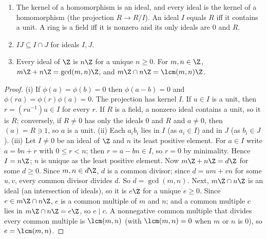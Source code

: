 \begin{proposition}\label{prop:rings:ideals}
\begin{enumerate}[label=(\roman*)]
\item The kernel of a homomorphism is an ideal, and every ideal is the kernel of a homomorphism (the projection
$R\to R/I$). An ideal $I$ equals $R$ iff it contains a unit. A ring is a field iff it is nonzero and its only ideals
are $0$ and $R$.
\item $IJ\subseteq I\cap J$ for ideals $I,J$.
\item Every ideal of $\Z$ is $n\Z$ for a unique $n\ge0$. For $m,n\in\Z$, $m\Z+n\Z=\gcd(m,n)\Z$, and $m\Z\cap n\Z=\lcm(m,n)\Z$.
\end{enumerate}
\end{proposition}

\begin{proof}
(i) If $\phi(a)=\phi(b)=0$ then $\phi(a-b)=0$ and $\phi(ra)=\phi(r)\phi(a)=0$. The projection has kernel $I$. If $u\in I$ is a unit,
then $r=(ru^{-1})u\in I$ for every $r$. If $R$ is a field, a nonzero ideal contains a unit, so it is $R$; conversely, if $R\ne0$
has only the ideals $0$ and $R$ and $a\ne0$, then $(a)=R\ni1$, so $a$ is a unit.
(ii) Each $a_ib_i$ lies in $I$ (as $a_i\in I$) and in $J$ (as $b_i\in J$).
(iii) Let $I\ne0$ be an ideal of $\Z$ and $n$ its least positive element. For $a\in I$ write $a=bn+r$ with $0\le r<n$; then
$r=a-bn\in I$, so $r=0$ by minimality. Hence $I=n\Z$; $n$ is unique as the least positive element. Now $m\Z+n\Z=d\Z$ for
some $d\ge0$. Since $m,n\in d\Z$, $d$ is a common divisor; since $d=um+vn$ for some $u,v$, every common divisor divides $d$.
So $d=\gcd(m,n)$. Next, $m\Z\cap n\Z$ is an ideal (an intersection of ideals), so it is $e\Z$ for a unique $e\ge0$. Since $e\in m\Z\cap n\Z$,
$e$ is a common multiple of $m$ and $n$; and a common multiple $c$ lies in $m\Z\cap n\Z=e\Z$, so $e\mid c$. A nonnegative common multiple that
divides every common multiple is $\lcm(m,n)$ (with $\lcm(m,n)=0$ when $m$ or $n$ is $0$), so $e=\lcm(m,n)$.
\end{proof}

